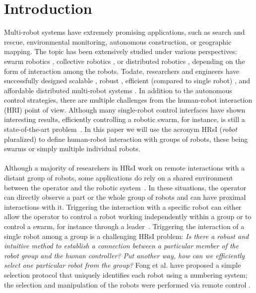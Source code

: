 \documentclass[smallextended]{svjour3}
\begin{document}
\section{Introduction}
\label{sec:introduction}
Multi-robot systems have extremely promising applications, such as search and rescue, environmental monitoring, autonomous construction, or geographic mapping. 
The topic has been extensively studied under various perspectives: swarm robotics \cite{brambilla2013}, collective robotics \cite{kernbach2013handbook}, or distributed robotics \cite{martinoli2012distributed}, depending on the form of interaction among the robots. 
Todate, researchers and engineers have successfully designed scalable \cite{rubenstein2012kilobot}, robust \cite{winfield2006safety}, efficient (compared to single robot) \cite{Bonani2012}, and affordable distributed multi-robot systems \cite{rubenstein2014programmable}. 
In addition to the autonomous control strategies, there are multiple challenges from the human-robot interaction (HRI) point of view. 
Although many single-robot control interfaces have shown interesting results, efficiently controlling a robotic swarm, for instance, is still a state-of-the-art problem~\cite{Kolling2016}.
In this paper we will use the acronym HRsI (\textit{robot} pluralized) to define human-robot interaction with groups of robots, these being swarms or simply multiple individual robots.\\
\\
Although a majority of researchers in HRsI work on remote interactions with a distant group of robots, some applications do rely on a shared environment between the operator and the robotic system~\cite{Kolling2016}. 
In these situations, the operator can directly observe a part or the whole group of robots and can have proximal interactions with it. 
Triggering the interaction with a specific robot can either allow the operator to control a robot working independently within a group or to control a swarm, for instance through a leader~\cite{Goodrich2012}.
Triggering the interaction of a single robot among a group is a challenging HRsI problem: \textit{Is there a robust and intuitive method to establish a connection between a particular member of the robot group and the human controller? 
Put another way, how can we efficiently select one particular robot from the group?} Fong et al. have proposed a simple selection protocol that uniquely identifies each robot using a numbering system; the selection and manipulation of the robots were performed via remote control \cite{fong2003}. 
\end{document}
